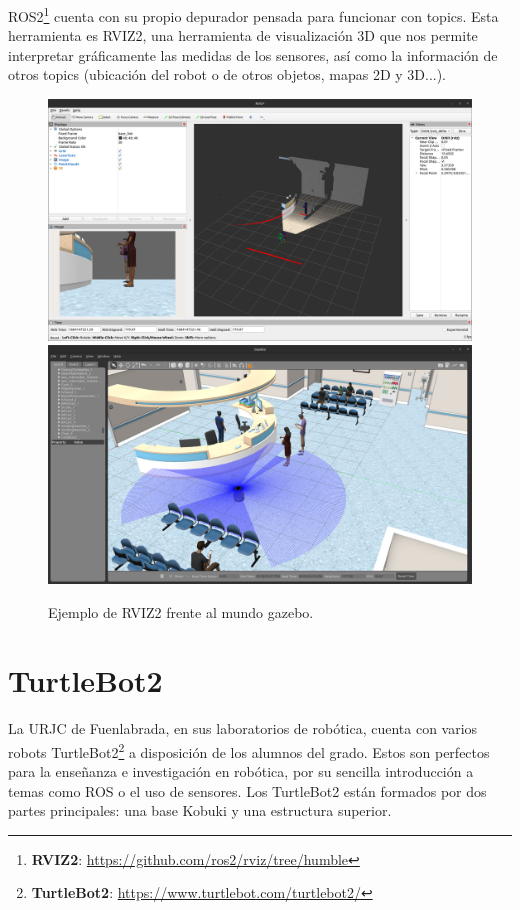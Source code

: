 ROS2\footnote{\textbf{RVIZ2}: \url{https://github.com/ros2/rviz/tree/humble}} cuenta con su propio depurador pensada para funcionar con topics.
Esta herramienta es RVIZ2, una herramienta de visualización 3D que nos permite interpretar gráficamente las medidas de los sensores,
así como la información de otros topics (ubicación del robot o de otros objetos, mapas 2D y 3D...).

\begin{figure} [H]
    \begin{center}
        \includegraphics[width=12cm]{figs/c3/RVIZ2.png}
        \includegraphics[width=12cm]{figs/c3/Gazebo_RVIZ.png}
    \end{center}
    \caption[RVIZ2 Vs mundo gazebo]{Ejemplo de RVIZ2 frente al mundo gazebo.}
    \label{fig:rviz2_example}
\end{figure}

\newpage

\section{TurtleBot2}
\label{sec:turtlebot2}

La URJC de Fuenlabrada, en sus laboratorios de robótica, cuenta con varios robots 
TurtleBot2\footnote{\textbf{TurtleBot2}: \url{https://www.turtlebot.com/turtlebot2/}} a disposición de los alumnos del grado. Estos son perfectos para
la enseñanza e investigación en robótica, por su sencilla introducción a temas como ROS o el uso de sensores. Los TurtleBot2 están formados por dos partes
principales: una base Kobuki y una estructura superior.


